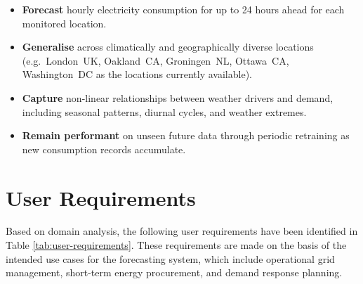 \documentclass[12pt, a4paper]{report}
\begin{document}
\begin{itemize}
    \item \textbf{Forecast} hourly electricity consumption for up to 24 hours ahead for each monitored location.
    \item \textbf{Generalise} across climatically and geographically diverse locations (e.g.\ London~UK, Oakland~CA, Groningen~NL, Ottawa~CA, Washington~DC as the locations currently available).
    \item \textbf{Capture} non-linear relationships between weather drivers and demand, including seasonal patterns, diurnal cycles, and weather extremes.
    \item \textbf{Remain performant} on unseen future data through periodic retraining as new consumption records accumulate.
\end{itemize}

\section{User Requirements}

Based on domain analysis, the following user requirements have been identified in Table \ref{tab:user-requirements}.
These requirements are made on the basis of the intended use cases for the forecasting system, which include operational grid management, short-term energy procurement, and demand response planning.
\end{document}
